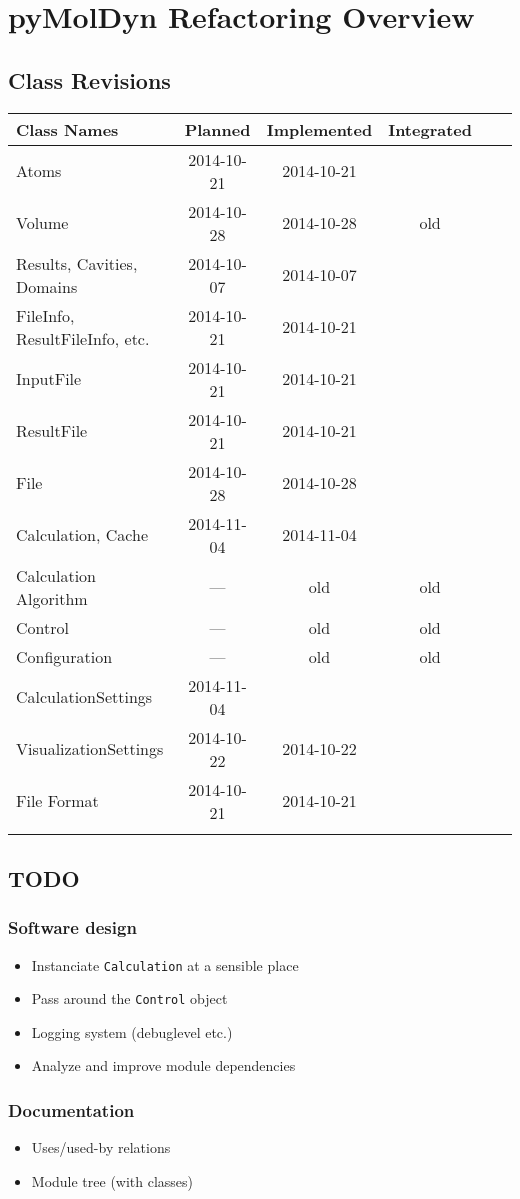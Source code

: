 \documentclass[final, oneside, a4paper, 11pt, pdftex, english]{scrreprt}
\begin{document}
\chapter*{pyMolDyn Refactoring Overview}
\section*{Class Revisions}

\begin{tabular}{|l|c|c|c|c|c|}
    \hline
    \textbf{Class Names} & \textbf{Planned} & \textbf{Implemented} & \textbf{Integrated} \\
    \hline
    Atoms & 2014-10-21 & 2014-10-21 & \\
    \hline
    Volume & 2014-10-28 & 2014-10-28 & old \\
    \hline
    Results, Cavities, Domains & 2014-10-07 & 2014-10-07 & \\
    \hline
    FileInfo, ResultFileInfo, etc. & 2014-10-21 & 2014-10-21 & \\
    \hline
    InputFile & 2014-10-21 & 2014-10-21 & \\
    \hline
    ResultFile & 2014-10-21 & 2014-10-21 & \\
    \hline
    File & 2014-10-28 & 2014-10-28 & \\
    \hline
    Calculation, Cache & 2014-11-04 & 2014-11-04 & \\
    \hline
    Calculation Algorithm & --- & old & old \\
    \hline
    Control & --- & old & old \\
    \hline
    Configuration & --- & old & old \\
    \hline
    CalculationSettings & 2014-11-04 & & \\
    \hline
    VisualizationSettings & 2014-10-22 & 2014-10-22 & \\
    \hline
    File Format & 2014-10-21 & 2014-10-21 & \\
    \hline
    & & & \\
    \hline
\end{tabular}


\section*{TODO}
\subsection*{Software design}
\begin{itemize}\itemsep0pt
    \item Instanciate \texttt{Calculation} at a sensible place
    \item Pass around the \texttt{Control} object
    \item Logging system (debuglevel etc.)
    \item Analyze and improve module dependencies
\end{itemize}


\subsection*{Documentation}
\begin{itemize}\itemsep0pt
    \item Uses/used-by relations
    \item Module tree (with classes)
\end{itemize}
\end{document}
